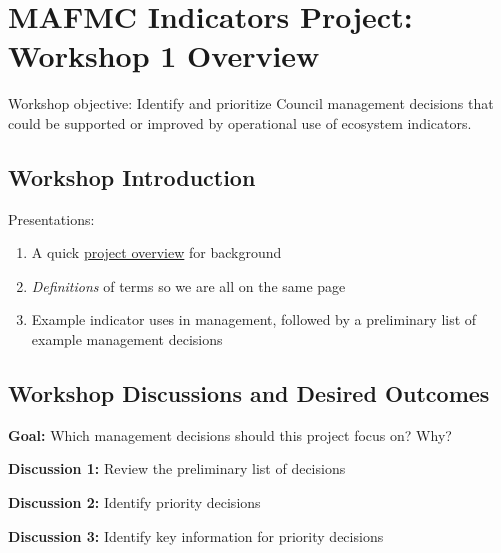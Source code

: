 \documentclass[
]{article}
\author{}
\date{\vspace{-2.5em}}
\begin{document}
\vspace{-1cm}

\section{MAFMC Indicators Project: Workshop 1
Overview}\label{mafmc-indicators-project-workshop-1-overview}

Workshop objective: Identify and prioritize Council management decisions
that could be supported or improved by operational use of ecosystem
indicators.

\subsection{Workshop Introduction}\label{workshop-introduction}

\begin{noteblock}

Presentations:

\begin{enumerate}
\def\labelenumi{\arabic{enumi}.}
\item
  A quick
  \href{https://www.mafmc.org/s/Project-5_IRA-Project-Brief.pdf}{project
  overview} for background
\item
  \emph{Definitions} of terms so we are all on the same page
\item
  Example indicator uses in management, followed by a preliminary list
  of example management decisions
\end{enumerate}

\end{noteblock}

\begin{ltgreenbox}

\subsection{Workshop Discussions and Desired
Outcomes}\label{workshop-discussions-and-desired-outcomes}

\textbf{Goal:} Which management decisions should this project focus on?
Why?

\textbf{Discussion 1:} Review the preliminary list of decisions

\textbf{Discussion 2:} Identify priority decisions

\textbf{Discussion 3:} Identify key information for priority decisions

\end{ltgreenbox}
\end{document}
